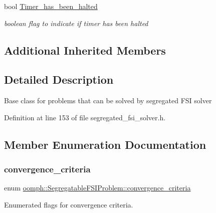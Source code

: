 \begin{DoxyCompactItemize}
bool \hyperlink{classoomph_1_1SegregatableFSIProblem_abb20be243e501b04b18da8697ce0985d}{Timer\+\_\+has\+\_\+been\+\_\+halted}
\begin{DoxyCompactList}\small\item\em boolean flag to indicate if timer has been halted \end{DoxyCompactList}\end{DoxyCompactItemize}
\subsection*{Additional Inherited Members}


\subsection{Detailed Description}
Base class for problems that can be solved by segregated F\+SI solver 

Definition at line 153 of file segregated\+\_\+fsi\+\_\+solver.\+h.



\subsection{Member Enumeration Documentation}
\mbox{\label{classoomph_1_1SegregatableFSIProblem_a06634a6823bb5062d11e97f0be78f373}} 
\subsubsection{\texorpdfstring{convergence\+\_\+criteria}{convergence\_criteria}}
{\footnotesize\ttfamily enum \hyperlink{classoomph_1_1SegregatableFSIProblem_a06634a6823bb5062d11e97f0be78f373}{oomph\+::\+Segregatable\+F\+S\+I\+Problem\+::convergence\+\_\+criteria}}



Enumerated flags for convergence criteria. 

